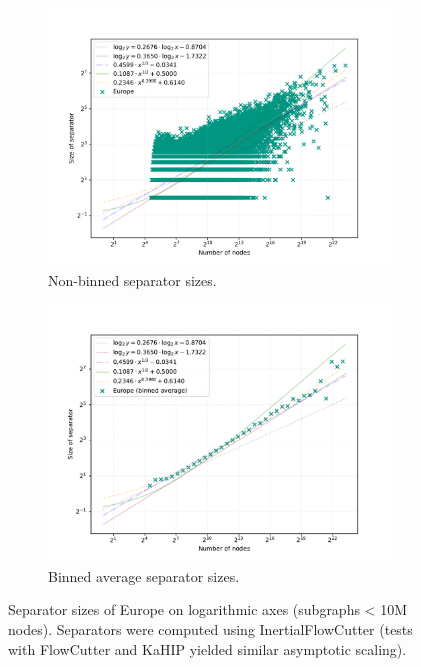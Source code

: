 \begin{figure}[tbhp]
    \begin{subfigure}[t]{0.49\linewidth}
        \centering
        \includegraphics[width=\linewidth]{graphics/Europe_non_binned.png}
        \caption{Non-binned separator sizes.}
        \label{fig:separator_size_loglog_non_binned}
    \end{subfigure}
    \hfill
    \begin{subfigure}[t]{0.49\linewidth}
        \centering
        \includegraphics[width=\linewidth]{graphics/Europe-binned.pdf}
        \caption{Binned average separator sizes.}
        \label{fig:separator_size_loglog_binned}
    \end{subfigure}
    \caption{Separator sizes of Europe on logarithmic axes (subgraphs < 10M nodes). Separators were computed using InertialFlowCutter (tests with FlowCutter and KaHIP yielded similar asymptotic scaling).}
    \label{fig:separator_size_loglog}
\end{figure}

